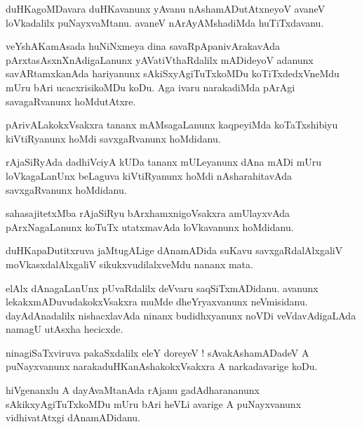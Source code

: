 \documentclass{article}
\begin{document}
\begin{mn}%
duHKagoMDavara duHKavanunx yAvanu nAshamADutAtxneyoV avaneV loVkadalilx puNayxvaMtanu. 
avaneV nArAyAMshadiMda huTiTxdavanu.
\end{mn}

\begin{mn}%
veYshAKamAsada huNiNxmeya dina savaRpApanivArakavAda pArxtasAsxnXnAdigaLanunx 
yAVatiVthaRdalilx mADideyoV adanunx savARtamxkanAda hariyanunx sAkiSxyAgiTuTxkoMDu 
koTiTxdedxVneMdu mUru bAri ucacxrisikoMDu koDu. Aga ivaru narakadiMda pArAgi 
savagaRvanunx hoMdutAtxre.
\end{mn}

\begin{mn}%
pArivALakokxVsakxra tananx mAMsagaLanunx kaqpeyiMda koTaTxshibiyu kiVtiRyanunx hoMdi 
savxgaRvanunx hoMdidanu.
\end{mn}

\begin{mn}%
rAjaSiRyAda dadhiVciyA kUDa tananx mULeyanunx dAna mADi mUru loVkagaLanUnx beLaguva 
kiVtiRyanunx hoMdi nAsharahitavAda savxgaRvanunx hoMdidanu.
\end{mn}

\begin{mn}%
sahasajitetxMba rAjaSiRyu bArxhamxnigoVsakxra amUlayxvAda pArxNagaLanunx koTuTx 
utatxmavAda loVkavanunx hoMdidanu.
\end{mn}

\begin{mn}%
duHKapaDutitxruva jaMtugALige dAnamADida suKavu savxgaRdalAlxgaliV moVkasxdalAlxgaliV 
sikukxvudilalxveMdu nananx mata.
\end{mn}

\begin{mn}%
elAlx dAnagaLanUnx pUvaRdalilx deVvaru saqSiTxmADidanu. avanunx lekakxmADuvudakokxVsakxra 
muMde dheYryaxvanunx  neVmisidanu. dayAdAnadalilx nishacxlavAda ninanx budidhxyanunx 
noVDi veVdavAdigaLAda namagU utAsxha hecicxde.
\end{mn}

\begin{mn}%
ninagiSaTxviruva pakaSxdalilx eleY doreyeV ! sAvakAshamADadeV A puNayxvanunx 
narakaduHKanAshakokxVsakxra A narkadavarige koDu.
\end{mn}

\begin{mn}%
hiVgenanxlu A dayAvaMtanAda rAjanu gadAdharananunx sAkikxyAgiTuTxkoMDu mUru bAri heVLi 
avarige A puNayxvanunx vidhivatAtxgi dAnamADidanu.
\end{mn}
\end{document}
